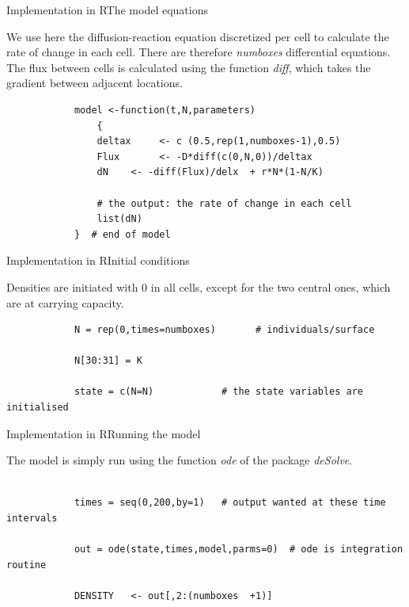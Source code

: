 \documentclass{eecslides}
\begin{document}
	
	\begin{frame}[fragile]{Implementation in R}{The model equations}
	
	We use here the diffusion-reaction equation discretized per cell to calculate the rate of change in each cell. There are therefore \emph{numboxes} differential equations. The flux between cells is calculated using the function \emph{diff}, which takes the gradient between adjacent locations.\\
		\begin{lstlisting}
			model <-function(t,N,parameters)
				{
				deltax     <- c (0.5,rep(1,numboxes-1),0.5)    
				Flux       <- -D*diff(c(0,N,0))/deltax
				dN    <- -diff(Flux)/delx  + r*N*(1-N/K)

				# the output: the rate of change in each cell
				list(dN)
			}  # end of model
		\end{lstlisting}

	\end{frame}

	
	\begin{frame}[fragile]{Implementation in R}{Initial conditions}
	
	Densities are initiated with 0 in all cells, except for the two central ones, which are at carrying capacity.\\
		\begin{lstlisting}
			N = rep(0,times=numboxes)       # individuals/surface

			N[30:31] = K

			state = c(N=N)            # the state variables are initialised

		\end{lstlisting}

	\end{frame}

	
	\begin{frame}[fragile]{Implementation in R}{Running the model}
	
	The model is simply run using the function \emph{ode} of the package \emph{deSolve}.\\
		\begin{lstlisting}
		
			times = seq(0,200,by=1)   # output wanted at these time intervals           

			out = ode(state,times,model,parms=0)  # ode is integration routine

			DENSITY   <- out[,2:(numboxes  +1)]

		\end{lstlisting}

	\end{frame}
\end{document}
